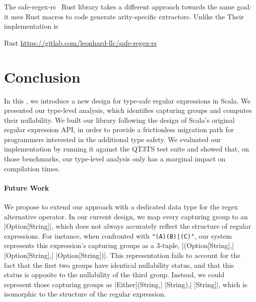 The safe-regex-rs~\citep{leonhard2021safe} Rust library takes a different approach towards the same goal: it uses Rust macros to code generate arity-specific extractors.
Unlike the
Their implementation is

Rust \url{https://gitlab.com/leonhard-llc/safe-regex-rs}

\section{Conclusion}
\label{sec:conclusion}

In this , we introduce a new design for type-safe regular expressions in Scala.
We presented our type-level analysis, which identifies capturing groups and computes their nullability.
We built our library following the design of Scala's original regular expression API, in order to provide a frictionless migration path for programmers interested in the additional type safety.
We evaluated our implementation by running it against the QT3TS test suite and showed that, on those benchmarks, our type-level analysis only has a marginal impact on compilation times.

\paragraph{Future Work}
We propose to extend our approach with a dedicated data type for the regex alternative operator.
In our current design, we map every capturing group to an |Option[String]|, which does not always accurately reflect the structure of regular expressions.
For instance, when confronted with \lstinline!"(A)(B)|(C)"!, our system represents this expression's capturing groups as a 3-tuple, |(Option[String],| |Option[String],| |Option[String])|. This representation fails to account for the fact that the first two groups have identical nullability status, and that this status is opposite to the nullability of the third group.
Instead, we could represent those capturing groups as |Either[(String,| |String),| |String]|, which is isomorphic to the structure of the regular expression.
